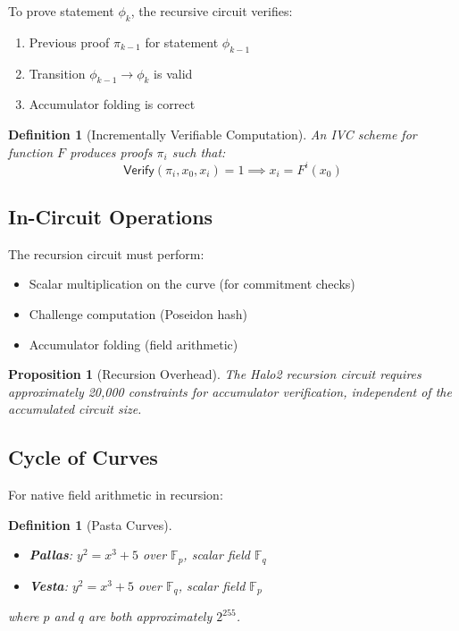 \documentclass[11pt,a4paper]{article}
\newtheorem{definition}[theorem]{Definition}
\newtheorem{proposition}[theorem]{Proposition}
\newcommand{\F}{\mathbb{F}}
\begin{document}
To prove statement $\phi_k$, the recursive circuit verifies:
\begin{enumerate}[label=(\roman*)]
    \item Previous proof $\pi_{k-1}$ for statement $\phi_{k-1}$
    \item Transition $\phi_{k-1} \to \phi_k$ is valid
    \item Accumulator folding is correct
\end{enumerate}

\begin{definition}[Incrementally Verifiable Computation]
An IVC scheme for function $F$ produces proofs $\pi_i$ such that:
\[
\mathsf{Verify}(\pi_i, x_0, x_i) = 1 \implies x_i = F^i(x_0)
\]
\end{definition}

\subsection{In-Circuit Operations}

The recursion circuit must perform:
\begin{itemize}
    \item Scalar multiplication on the curve (for commitment checks)
    \item Challenge computation (Poseidon hash)
    \item Accumulator folding (field arithmetic)
\end{itemize}

\begin{proposition}[Recursion Overhead]
The Halo2 recursion circuit requires approximately 20,000 constraints for accumulator verification, independent of the accumulated circuit size.
\end{proposition}

\subsection{Cycle of Curves}

For native field arithmetic in recursion:

\begin{definition}[Pasta Curves]
\begin{itemize}
    \item \textbf{Pallas}: $y^2 = x^3 + 5$ over $\F_p$, scalar field $\F_q$
    \item \textbf{Vesta}: $y^2 = x^3 + 5$ over $\F_q$, scalar field $\F_p$
\end{itemize}
where $p$ and $q$ are both approximately $2^{255}$.
\end{definition}
\end{document}

